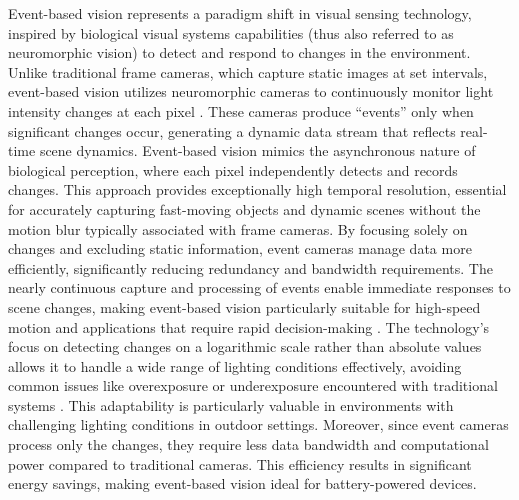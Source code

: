 \documentclass{article}
\begin{document}
Event-based vision represents a paradigm shift in visual sensing technology, inspired by biological visual systems capabilities (thus also referred to as neuromorphic vision) to detect and respond to changes in the environment. Unlike traditional frame cameras, which capture static images at set intervals, event-based vision utilizes neuromorphic cameras to continuously monitor light intensity changes at each pixel \cite{chakravarthiRecentEventCamera2024}. These cameras produce “events” only when significant changes occur, generating a dynamic data stream that reflects real-time scene dynamics. Event-based vision mimics the asynchronous nature of biological perception, where each pixel independently detects and records changes. This approach provides exceptionally high temporal resolution, essential for accurately capturing fast-moving objects and dynamic scenes without the motion blur typically associated with frame cameras. By focusing solely on changes and excluding static information, event cameras manage data more efficiently, significantly reducing redundancy and bandwidth requirements. The nearly continuous capture and processing of events enable immediate responses to scene changes, making event-based vision particularly suitable for high-speed motion and applications that require rapid decision-making \cite{DenseContinuousTimeOptical, gehrigERAFTDenseOptical2021, forraiEventbasedAgileObject2023, jiangFullyAsynchronousNeuromorphic2024, vidalUltimateSLAMCombining2018, falangaDynamicObstacleAvoidance2020}. The technology’s focus on detecting changes on a logarithmic scale rather than absolute values allows it to handle a wide range of lighting conditions effectively, avoiding common issues like overexposure or underexposure encountered with traditional systems \cite{gallegoEventbasedVisionSurvey2022, gehrigLowlatencyAutomotiveVision2024}. This adaptability is particularly valuable in environments with challenging lighting conditions in outdoor settings. Moreover, since event cameras process only the changes, they require less data bandwidth and computational power compared to traditional cameras. This efficiency results in significant energy savings, making event-based vision ideal for battery-powered devices. 
\end{document}
